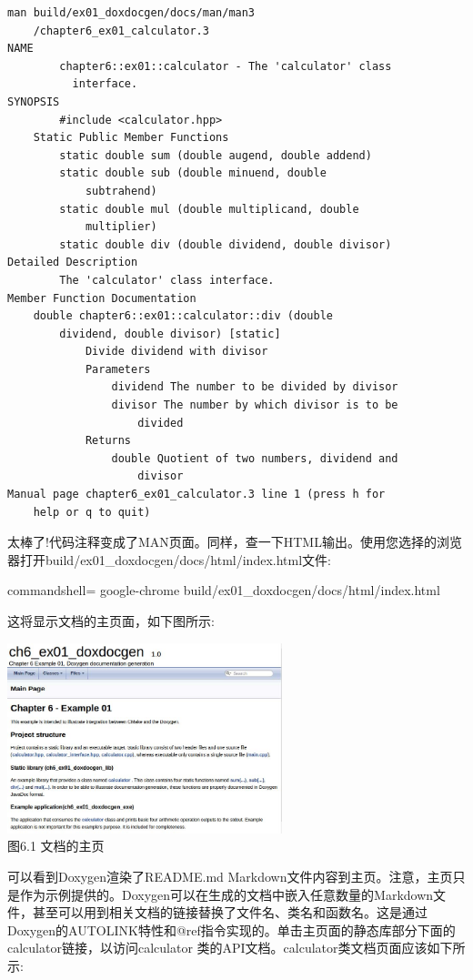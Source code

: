 \begin{lstlisting}[style=styleCMake]
man build/ex01_doxdocgen/docs/man/man3
	/chapter6_ex01_calculator.3
NAME
		chapter6::ex01::calculator - The 'calculator' class
		  interface.
SYNOPSIS
		#include <calculator.hpp>
	Static Public Member Functions
		static double sum (double augend, double addend)
		static double sub (double minuend, double
			subtrahend)
		static double mul (double multiplicand, double
			multiplier)
		static double div (double dividend, double divisor)
Detailed Description
		The 'calculator' class interface.
Member Function Documentation
	double chapter6::ex01::calculator::div (double
		dividend, double divisor) [static]
			Divide dividend with divisor
			Parameters
				dividend The number to be divided by divisor
				divisor The number by which divisor is to be
					divided
			Returns
				double Quotient of two numbers, dividend and
					divisor
Manual page chapter6_ex01_calculator.3 line 1 (press h for
	help or q to quit)
\end{lstlisting}

太棒了!代码注释变成了MAN页面。同样，查一下HTML输出。使用您选择的浏览器打开build/ex01\_doxdocgen/docs/html/index.html文件:

\begin{tcblisting}{commandshell={}}
google-chrome build/ex01_doxdocgen/docs/html/index.html
\end{tcblisting}

这将显示文档的主页面，如下图所示:

\begin{center}
\includegraphics[width=0.6\textwidth]{content/2/chapter6/images/1.jpg}\\
图6.1 文档的主页
\end{center}

可以看到Doxygen渲染了README.md Markdown文件内容到主页。注意，主页只是作为示例提供的。Doxygen可以在生成的文档中嵌入任意数量的Markdown文件，甚至可以用到相关文档的链接替换了文件名、类名和函数名。这是通过Doxygen的AUTOLINK特性和@ref指令实现的。单击主页面的静态库部分下面的calculator链接，以访问calculator 类的API文档。calculator类文档页面应该如下所示:

